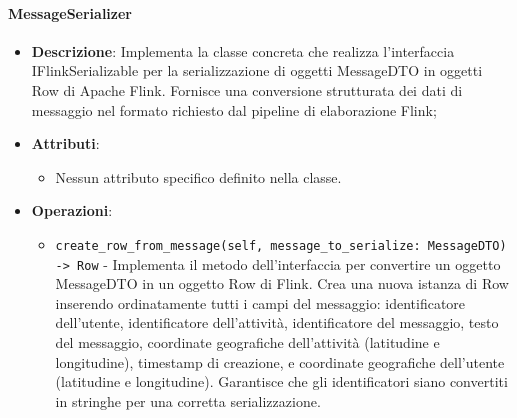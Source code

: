 \documentclass[10pt]{article}
\begin{document}
    \paragraph{MessageSerializer}
    \begin{itemize} 
    \item \textbf{Descrizione}: Implementa la classe concreta che realizza l'interfaccia IFlinkSerializable per la serializzazione di oggetti MessageDTO in oggetti Row di Apache Flink. Fornisce una conversione strutturata dei dati di messaggio nel formato richiesto dal pipeline di elaborazione Flink;
    \item \textbf{Attributi}:
    \begin{itemize}
        \item Nessun attributo specifico definito nella classe.
    \end{itemize}
    
    \item \textbf{Operazioni}:
    \begin{itemize}
        \item \texttt{create\_row\_from\_message(self, message\_to\_serialize: MessageDTO) -> Row} - Implementa il metodo dell'interfaccia per convertire un oggetto MessageDTO in un oggetto Row di Flink. Crea una nuova istanza di Row inserendo ordinatamente tutti i campi del messaggio: identificatore dell'utente, identificatore dell'attività, identificatore del messaggio, testo del messaggio, coordinate geografiche dell'attività (latitudine e longitudine), timestamp di creazione, e coordinate geografiche dell'utente (latitudine e longitudine). Garantisce che gli identificatori siano convertiti in stringhe per una corretta serializzazione.
    \end{itemize}
    \end{itemize}
\end{document}
